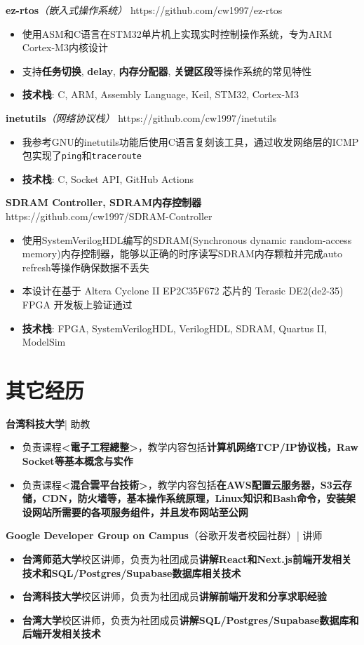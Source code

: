 \documentclass{resume}
\newcommand{\iconsection}[2]{
  \section[\texorpdfstring{#2}{#2}]{\faIcon{#1}\quad #2}
}
\begin{document}
  \datedsubsection
  {\textbf{ez-rtos}\textit{（嵌入式操作系统）}}
  {https://github.com/cw1997/ez-rtos}
  \begin{itemize}
    \item 使用ASM和C语言在STM32单片机上实现实时控制操作系统，专为ARM Cortex-M3内核设计
    \item 支持\textbf{任务切换}, \textbf{delay}, \textbf{内存分配器}, \textbf{关键区段}等操作系统的常见特性
    \item \textbf{技术栈}: C, ARM, Assembly Language, Keil, STM32, Cortex-M3
  \end{itemize}

  \datedsubsection
  {\textbf{inetutils}\textit{（网络协议栈）}}
  {https://github.com/cw1997/inetutils}
  \begin{itemize}
    \item 我参考GNU的inetutils功能后使用C语言复刻该工具，通过收发网络层的ICMP包实现了\texttt{ping}和\texttt{traceroute}
    \item \textbf{技术栈}: C, Socket API, GitHub Actions
  \end{itemize}

  \datedsubsection
  {\textbf{SDRAM Controller, SDRAM内存控制器}}
  {https://github.com/cw1997/SDRAM-Controller}
  \begin{itemize}
    \item 使用SystemVerilogHDL编写的SDRAM(Synchronous dynamic random-access memory)内存控制器，能够以正确的时序读写SDRAM内存颗粒并完成auto refresh等操作确保数据不丢失
    \item 本设计在基于 Altera Cyclone II EP2C35F672 芯片的 Terasic DE2(de2-35) FPGA 开发板上验证通过
    \item \textbf{技术栈}: FPGA, SystemVerilogHDL, VerilogHDL, SDRAM, Quartus II, ModelSim
  \end{itemize}

  \iconsection{history}{其它经历}

  \datedsubsection
  {\textbf{台湾科技大学}| 助教}
  {}
  \begin{itemize}
    \item 负责课程\textbf{<電子工程總整>}，教学内容包括\textbf{计算机网络TCP/IP协议栈，Raw Socket等基本概念与实作}
    \item 负责课程\textbf{<混合雲平台技術>}，教学内容包括\textbf{在AWS配置云服务器，S3云存储，CDN，防火墙等，基本操作系统原理，Linux知识和Bash命令，安装架设网站所需要的各项服务组件，并且发布网站至公网}
  \end{itemize}

  \datedsubsection
  {\textbf{Google Developer Group on Campus}（谷歌开发者校园社群）| 讲师}
  {}
  \begin{itemize}
    \item \textbf{台湾师范大学}校区讲师，负责为社团成员\textbf{讲解React和Next.js前端开发相关技术和SQL/Postgres/Supabase数据库相关技术}
    \item \textbf{台湾科技大学}校区讲师，负责为社团成员\textbf{讲解前端开发和分享求职经验}
    \item \textbf{台湾大学}校区讲师，负责为社团成员\textbf{讲解SQL/Postgres/Supabase数据库和后端开发相关技术}
  \end{itemize}
\end{document}
